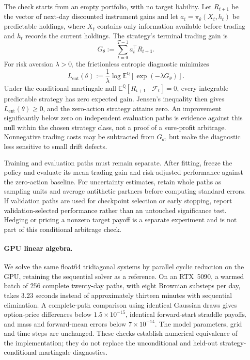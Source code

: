 \documentclass[11pt]{article}
\newcommand{\E}{\mathbb E}
\newcommand{\Q}{\mathbb Q}
\theoremstyle{plain}
\theoremstyle{definition}
\theoremstyle{remark}
\begin{document}
The check starts from an empty portfolio, with no target liability.  Let
$R_{t+1}$ be the vector of next-day discounted instrument gains and let
$a_t=\pi_\theta(X_t,h_t)$ be predictable holdings, where $X_t$ contains only
information available before trading and $h_t$ records the current holdings.
The strategy's terminal trading gain is
\begin{equation}
  G_\theta:=\sum_{t=0}^{T-1}a_t^\top R_{t+1}.
  \label{eq:conditional-check-trading-gain}
\end{equation}
For risk aversion $\lambda>0$, the frictionless entropic diagnostic minimizes
\begin{equation}
  L_{\mathrm{ent}}(\theta)
  :=\frac{1}{\lambda}\log\E^\Q\!\left[
    \exp(-\lambda G_\theta)\right].
  \label{eq:conditional-check-entropic-loss}
\end{equation}
Under the conditional martingale null
$\E^\Q[R_{t+1}\mid\mathcal F_t]=0$, every integrable predictable strategy
has zero expected gain.  Jensen's inequality then gives
$L_{\mathrm{ent}}(\theta)\geq0$, and the zero-action strategy attains zero.
An improvement significantly below zero on independent evaluation paths is evidence
against this null within the chosen strategy class, not a proof of a
sure-profit arbitrage.  Nonnegative trading costs may be subtracted from
$G_\theta$, but make the diagnostic less sensitive to small drift defects.

Training and evaluation paths must remain separate.  After fitting, freeze
the policy and evaluate its mean trading gain and risk-adjusted performance
against the zero-action baseline.  For uncertainty estimates, retain whole
paths as sampling units and average antithetic partners before computing
standard errors.  If validation paths are used for checkpoint selection or
early stopping, report validation-selected performance rather than an
untouched significance test.  Hedging or pricing a nonzero target payoff is
a separate experiment and is not part of this conditional arbitrage check.

\paragraph{GPU linear algebra.}
We solve the same float64 tridiagonal systems by parallel cyclic reduction
on the GPU, retaining the sequential solver as a reference.  On an RTX~5090,
a warmed batch of 256 complete twenty-day paths, with eight Brownian
substeps per day, takes $3.23$ seconds instead of approximately thirteen
minutes with sequential elimination.  A complete-path comparison using
identical Gaussian draws gives option-price differences below
$1.5\times10^{-15}$, identical forward-start straddle payoffs, and
mass and forward-mean errors below $7\times10^{-14}$.  The model parameters,
grid and time steps are unchanged.  These checks establish numerical
equivalence of the implementation; they do not replace the unconditional
and held-out strategy-conditional martingale diagnostics.
\end{document}
